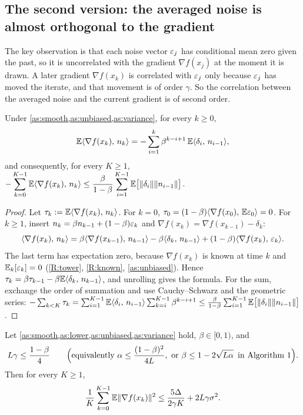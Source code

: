 \subsection{The second version: the averaged noise is almost orthogonal to the gradient}

The key observation is that each noise vector $\varepsilon_j$ has conditional mean zero given the
past, so it is uncorrelated with the gradient $\nabla f(x_j)$ at the moment it is drawn. A later gradient $\nabla f(x_k)$ is correlated with $\varepsilon_j$ only
because $\varepsilon_j$ has moved the iterate, and that movement is of order $\gamma$. So the
correlation between the averaged noise and the current gradient is of second order.

\begin{lemma}\label{lem:noise-correlation}
Under \cref{as:smooth,as:unbiased,as:variance}, for every $k\ge0$,
\[
  \mathbb{E}\langle \nabla f(x_k),\, n_k\rangle=-\sum_{i=1}^{k}\beta^{k-i+1}\,\mathbb{E}\langle \delta_i,\, n_{i-1}\rangle,
\]
and consequently, for every $K\ge1$,
$\displaystyle-\sum_{k=0}^{K-1}\mathbb{E}\langle \nabla f(x_k),\, n_k\rangle\le\frac{\beta}{1-\beta}\sum_{i=1}^{K-1}\mathbb{E}\bigl[\lVert \delta_i\rVert\lVert n_{i-1}\rVert\bigr]$.
\end{lemma}

\begin{proof}
Let $\tau_k:=\mathbb{E}\langle \nabla f(x_k),\, n_k\rangle$. For $k=0$, $\tau_0=(1-\beta)\langle \nabla f(x_0),\, \mathbb{E}\varepsilon_0\rangle=0$.
For $k\ge1$, insert $n_k=\beta n_{k-1}+(1-\beta)\varepsilon_k$ and $\nabla f(x_k)=\nabla f(x_{k-1})-\delta_k$:
\[
  \langle \nabla f(x_k),\, n_k\rangle=\beta\langle \nabla f(x_{k-1}),\, n_{k-1}\rangle-\beta\langle \delta_k,\, n_{k-1}\rangle
  +(1-\beta)\langle \nabla f(x_k),\, \varepsilon_k\rangle.
\]
The last term has expectation zero, because $\nabla f(x_k)$ is known at time $k$ and
$\mathbb{E}_k[\varepsilon_k]=0$ (\ref{R:tower}, \ref{R:known}, \cref{as:unbiased}). Hence
$\tau_k=\beta\tau_{k-1}-\beta\mathbb{E}\langle \delta_k,\, n_{k-1}\rangle$, and unrolling gives the formula. For
the sum, exchange the order of summation and use Cauchy--Schwarz and the geometric series:
$-\sum_{k<K}\tau_k=\sum_{i=1}^{K-1}\mathbb{E}\langle \delta_i,\, n_{i-1}\rangle\sum_{k=i}^{K-1}\beta^{k-i+1}
\le\frac{\beta}{1-\beta}\sum_{i=1}^{K-1}\mathbb{E}\bigl[\lVert \delta_i\rVert\lVert n_{i-1}\rVert\bigr]$.
\end{proof}

\begin{tcolorbox}[keybox]
\begin{theorem}\label{thm:lf}
Let \cref{as:smooth,as:lower,as:unbiased,as:variance} hold, $\beta\in[0,1)$, and
\[
  L\gamma\le\frac{1-\beta}{4}\qquad\Bigl(\text{equivalently }\alpha\le\frac{(1-\beta)^2}{4L},
  \text{ or }\beta\le1-2\sqrt{L\alpha}\,\text{ in Algorithm~1}\Bigr).
\]
Then for every $K\ge1$,
\[
  \frac1K\sum_{k=0}^{K-1}\mathbb{E}\lVert \nabla f(x_k)\rVert^2\le\frac{5\Delta}{2\gamma K}+2L\gamma\sigma^2 .
\]
\end{theorem}
\end{tcolorbox}

